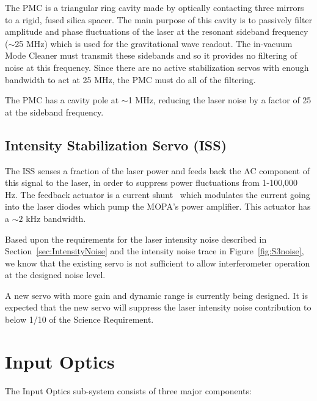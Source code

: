 The PMC is a triangular ring cavity made by optically contacting
three mirrors to a rigid, fused silica spacer. The main purpose of this
cavity is to passively filter amplitude and phase fluctuations of the
laser at the resonant sideband frequency ($\sim$25 MHz) which is used
for the gravitational wave readout. The in-vacuum Mode Cleaner must transmit 
these sidebands and so it provides no filtering of noise at this frequency.
Since there are no active stabilization servos with enough bandwidth 
to act at 25 MHz, the PMC must do all of the filtering.

The PMC has a cavity pole at $\sim$1 MHz, reducing the 
laser noise by a factor of 25 at the sideband frequency.

\subsection{Intensity Stabilization Servo (ISS)}

The ISS senses a fraction of the laser power and feeds back the AC component
of this signal to the laser, in order to suppress power fluctuations from
1-100,000 Hz. The feedback actuator is a current shunt~\cite{PK:CS} which
modulates the current going into the laser diodes which pump the MOPA's
power amplifier. This actuator has a $\sim2$ kHz bandwidth.

Based upon the requirements for the laser intensity noise described
in Section~\ref{sec:IntensityNoise} and the intensity noise trace in
Figure~\ref{fig:S3noise}, we know that the existing servo is not 
sufficient to allow interferometer operation at the designed noise level.

A new servo with more gain and dynamic range is currently being designed.
It is expected that the new servo will suppress the laser intensity noise
contribution to below 1/10 of the Science Requirement.


\section{Input Optics}
\label{app:IOO}

The Input Optics sub-system consists of three major components:

